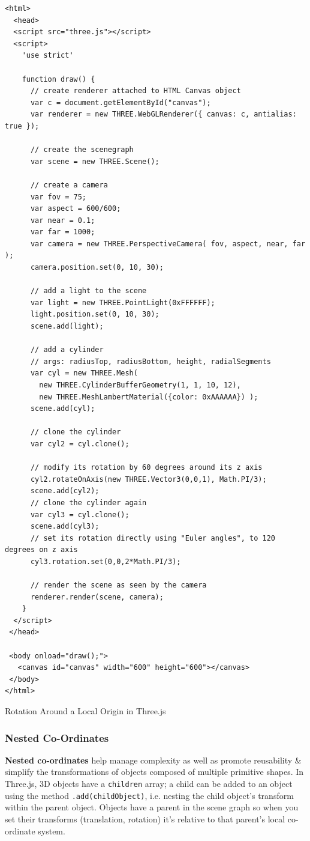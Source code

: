 \documentclass[a4paper,11pt]{article}
\newenvironment{code}{\captionsetup{type=listing}}{}
\begin{document}
\begin{code}
\begin{verbatim}
<html>
  <head>
  <script src="three.js"></script>
  <script>
    'use strict'

    function draw() {
      // create renderer attached to HTML Canvas object
      var c = document.getElementById("canvas");
      var renderer = new THREE.WebGLRenderer({ canvas: c, antialias: true });

      // create the scenegraph
      var scene = new THREE.Scene();

      // create a camera
      var fov = 75;
      var aspect = 600/600;
      var near = 0.1;
      var far = 1000;
      var camera = new THREE.PerspectiveCamera( fov, aspect, near, far );
      camera.position.set(0, 10, 30);

      // add a light to the scene
      var light = new THREE.PointLight(0xFFFFFF);
      light.position.set(0, 10, 30);
      scene.add(light);

      // add a cylinder 
      // args: radiusTop, radiusBottom, height, radialSegments
      var cyl = new THREE.Mesh(
        new THREE.CylinderBufferGeometry(1, 1, 10, 12), 
        new THREE.MeshLambertMaterial({color: 0xAAAAAA}) );
      scene.add(cyl);

      // clone the cylinder
      var cyl2 = cyl.clone();
     
      // modify its rotation by 60 degrees around its z axis
      cyl2.rotateOnAxis(new THREE.Vector3(0,0,1), Math.PI/3);
      scene.add(cyl2);
      // clone the cylinder again
      var cyl3 = cyl.clone();
      scene.add(cyl3);
      // set its rotation directly using "Euler angles", to 120 degrees on z axis
      cyl3.rotation.set(0,0,2*Math.PI/3);
      
      // render the scene as seen by the camera
      renderer.render(scene, camera);
    }
  </script>
 </head>

 <body onload="draw();">
   <canvas id="canvas" width="600" height="600"></canvas>
 </body>
</html>
\end{verbatim}
\caption{Rotation Around a Local Origin in Three.js}
\end{code}

\subsubsection{Nested Co-Ordinates}
\textbf{Nested co-ordinates} help manage complexity as well as promote reusability \& simplify the transformations of
objects composed of multiple primitive shapes.
In Three.js, 3D objects have a \texttt{children} array;
a child can be added to an object using the method \texttt{.add(childObject)}, i.e. nesting the child 
object's transform within the parent object.
Objects have a parent in the scene graph so when you set their transforms (translation, rotation) it's relative to that
parent's local co-ordinate system.
\end{document}
